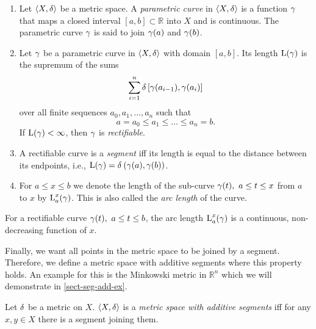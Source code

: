 \begin{defi} \label{def-curve} %
	\leavevmode \vspace{-\baselineskip}
	\begin{enumerate}
		\item Let $\langle X, \operatorname{\delta} \rangle$ be a metric space. A \emph{parametric curve} in $\langle X, \operatorname{\delta} \rangle$ is a function $\operatorname{\gamma}$ that maps a closed interval $[a, b] \subset \mathbb{R}$ into $X$ and is continuous. The parametric curve $\operatorname{\gamma}$ is said to join $\operatorname{\gamma}(a)$ and $\operatorname{\gamma}(b)$. 
    \item Let $\operatorname{\gamma}$ be a parametric curve in $\langle X, \operatorname{\delta} \rangle$ with domain $[a, b]$. Its length $\operatorname{L}(\operatorname{\gamma})$ is the supremum of the sums  \label{def-curve-len}
		      $$
			      \sum_{i=1}^{n} \operatorname{\delta} \left[ \operatorname{\gamma}(a_{i-1}), \operatorname{\gamma}(a_i) \right]
		      $$
		      over all finite sequences $a_0, a_1, \dots, a_n$ such that
		      $$
			      a = a_0 \leq a_1 \leq \dots \leq a_n = b.
		      $$ 
		      If $\operatorname{L}(\operatorname{\gamma}) < \infty$, then $\operatorname{\gamma}$ is \emph{rectifiable}. 
        \item A rectifiable curve is a \emph{segment} iff its length is equal to the distance between its endpoints, i.e., $\operatorname{L}(\operatorname{\gamma}) = \operatorname{\delta}_{} \left( \operatorname{\gamma}(a), \operatorname{\gamma}(b) \right)$. 
        \item For $a \leq x \leq b$ we denote the length of the sub-curve $\operatorname{\gamma}(t),~ a \leq t \leq x$ from $a$ to $x$ by $\sublen$. This is also called the \emph{arc length} of the curve. \label{def-curve-sublen} 
	\end{enumerate}
\end{defi}

\begin{rem} \label{thm-curve-sublen-cont} %
	For a rectifiable curve $\operatorname{\gamma}(t), ~ a \leq t \leq b$, the arc length $\sublen$ is a continuous, non-decreasing function of $x$.
\end{rem}

Finally, we want all points in the metric space to be joined by a segment. Therefore, we define a metric space with additive segments where this property holds.
An example for this is the Minkowski metric in $\mathbb{R}^n$ which we will demonstrate in \cref{sect-seg-add-ex}.

\begin{defi}  \label{def-metric-space-add-segments}
	Let $\operatorname{\delta}$ be a metric on $X$. $\langle X, \operatorname{\delta} \rangle$ is a \emph{metric space with additive segments} iff for any $x, y \in  X$ there is a segment joining them.
\end{defi}
